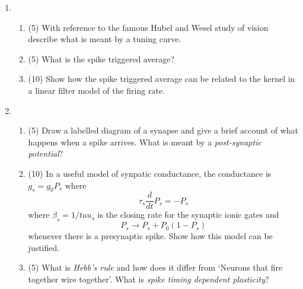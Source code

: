 \documentclass[12pt]{article}
\begin{document}
\begin{enumerate}
\item
\begin{enumerate}
\item (5) With reference to the famous Hubel and Wesel study of vision describe what is meant by a tuning curve.
\item (5) What is the spike triggered average?
\item (10) Show how the spike triggered average can be related to the kernel in a linear filter model of the firing rate.
\end{enumerate}

\item
\begin{enumerate}
\item (5) Draw a labelled diagram of a synapse and give a brief account of what happens when a spike arrives. What is meant by a {\sl post-synaptic potential}?
\item (10) In a useful model of synpatic conductance, the conductance is $g_s=g_0P_s$ where 
\begin{equation}
\tau_s\frac{d}{dt}P_s=-P_s
\end{equation}
where $\beta_s=1/tau_s$ is the closing rate for the synaptic ionic gates and
\begin{equation}
P_s\rightarrow P_s+P_0(1-P_s)
\end{equation}
whenever there is a presynaptic spike. Show how this model can be justified. 
\item (5) What is {\sl Hebb's rule} and how does it differ from \lq{}Neurons that fire together wire together\rq{}. What is {\sl spike timing dependent plasticity}?
\end{enumerate}
\end{enumerate}
\end{document}
